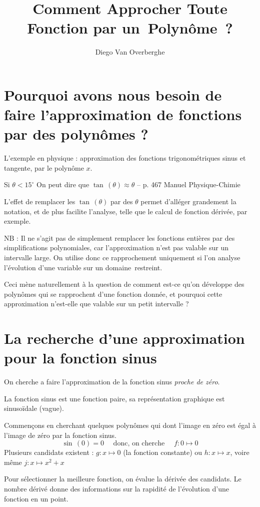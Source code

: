 \documentclass[DIV=12]{scrartcl}
\title{Comment Approcher Toute Fonction par un~Polynôme~?}
\author{Diego Van Overberghe}
\begin{document}
    \maketitle
    \section{Pourquoi avons nous besoin de faire l'approximation de fonctions par des polynômes ?}
    L'exemple en physique : approximation des fonctions trigonométriques sinus et tangente, par le polynôme $x$.
    \begin{center}
        \og Si $\theta<15^{\circ}$ On peut dire que $\tan\,(\theta)\approx\theta$ \fg{}\quad -- p. 467 Manuel Physique-Chimie
    \end{center}
    L'effet de remplacer les $\tan\,(\theta)$ par des $\theta$ permet d'alléger grandement la notation, et de plus facilite l'analyse, telle que le calcul de fonction dérivée, par exemple. 

    $\mathrm{N}\mathrm{B}$ : Il ne s'agit pas de simplement remplacer les fonctions entières par des simplifications polynomiales, car l'approximation n'est pas valable sur un intervalle large. On  utilise donc ce rapprochement uniquement si l'on analyse l'évolution d'une variable sur un domaine~restreint.

    Ceci mène naturellement à la question de comment est-ce qu'on développe des polynômes qui se rapprochent d'une fonction donnée, et pourquoi cette approximation n'est-elle que valable sur un petit intervalle ?

    \section{La recherche d'une approximation pour la fonction sinus}
    On cherche a faire l'approximation de la fonction sinus \emph{proche de zéro}.

    La fonction sinus est une fonction paire, sa représentation graphique est sinusoïdale (vague). 
    
    Commençons en cherchant quelques polynômes qui dont l'image en zéro est égal à l'image de zéro par la fonction sinus.
    \[\sin\,(0)=0\quad\text{ donc, on cherche }\quad f:0\mapsto 0\]
    Plusieurs candidats existent : $g:x\mapsto 0$ (la fonction constante) ou $h:x\mapsto x$, voire même $j:x\mapsto x^2+x$
    
    Pour sélectionner la meilleure fonction, on évalue la dérivée des candidats. Le nombre dérivé donne des informations sur la rapidité de l'évolution d'une fonction en un point.
    
\end{document}
